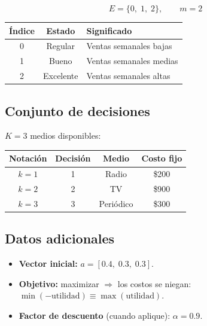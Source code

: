 \documentclass[12pt,a4paper]{article}
\begin{document}
\[ E = \{0,\; 1,\; 2\}, \qquad m = 2 \]

\begin{center}
\begin{tabular}{c c l}
\toprule
\textbf{Índice} & \textbf{Estado} & \textbf{Significado} \\
\midrule
0 & Regular   & Ventas semanales bajas \\
1 & Bueno     & Ventas semanales medias \\
2 & Excelente & Ventas semanales altas \\
\bottomrule
\end{tabular}
\end{center}

\subsection*{Conjunto de decisiones}

$K = 3$ medios disponibles:

\begin{center}
\begin{tabular}{c c c c}
\toprule
\textbf{Notación} & \textbf{Decisión} & \textbf{Medio} & \textbf{Costo fijo}\\
\midrule
$k = 1$ & 1 & Radio     & \$200 \\
$k = 2$ & 2 & TV        & \$900 \\
$k = 3$ & 3 & Periódico & \$300 \\
\bottomrule
\end{tabular}
\end{center}

\subsection*{Datos adicionales}

\begin{itemize}
    \item \textbf{Vector inicial:} $a = [0.4,\; 0.3,\; 0.3]$.
    \item \textbf{Objetivo:} maximizar $\Rightarrow$ los costos se niegan: $\min(-\text{utilidad}) \equiv \max(\text{utilidad})$.
    \item \textbf{Factor de descuento} (cuando aplique): $\alpha = 0.9$.
\end{itemize}

\newpage

\end{document}
